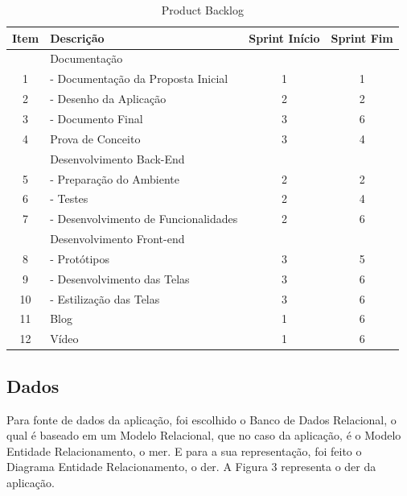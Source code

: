 \documentclass[
    12pt,               %
    openright,          %
    oneside,
    a4paper,            %
    paginasA3,  %
    english,            %
    brazil              %
    ]{ifsp-spo-inf-ctds} %
\begin{document}
\ABNTEXfontereduzida
\begin{table}[htb]
\centering
\caption{Product Backlog}
\begin{tabular}{| c | l | c | c |}
    \hline
     Item & Descrição & Sprint Início & Sprint Fim  \\
    \hline  
      & Documentação &  &   \\
    \hline  
     1 & - Documentação da Proposta Inicial & 1 & 1  \\
    \hline
     2 & - Desenho da Aplicação & 2 & 2  \\
    \hline
     3 & - Documento Final & 3 & 6 \\
    \hline
     4 & Prova de Conceito & 3 & 4 \\
    \hline
      & Desenvolvimento Back-End &  &   \\
    \hline
     5 & - Preparação do Ambiente & 2 & 2  \\
    \hline
     6 & - Testes & 2 &  4 \\
    \hline
     7 & - Desenvolvimento de Funcionalidades & 2 & 6  \\
    \hline
      & Desenvolvimento Front-end &  &    \\
    \hline
     8 & - Protótipos & 3 & 5 \\
    \hline
     9 & - Desenvolvimento das Telas & 3 &  6 \\
    \hline
     10 & - Estilização das Telas & 3 &  6 \\
    \hline
     11 &  Blog & 1 & 6  \\
    \hline
     12 &  Vídeo & 1 & 6  \\
   \hline
\end{tabular}
\end{table}
\FloatBarrier

\subsection{Dados}
Para fonte de dados da aplicação, foi escolhido o Banco de Dados Relacional, o qual é baseado em um Modelo Relacional, que no caso da aplicação, é o Modelo Entidade Relacionamento, o \ac{mer}. E para a sua representação, foi feito o Diagrama Entidade Relacionamento, o \ac{der}. A Figura 3 representa o \ac{der} da aplicação.
\end{document}
